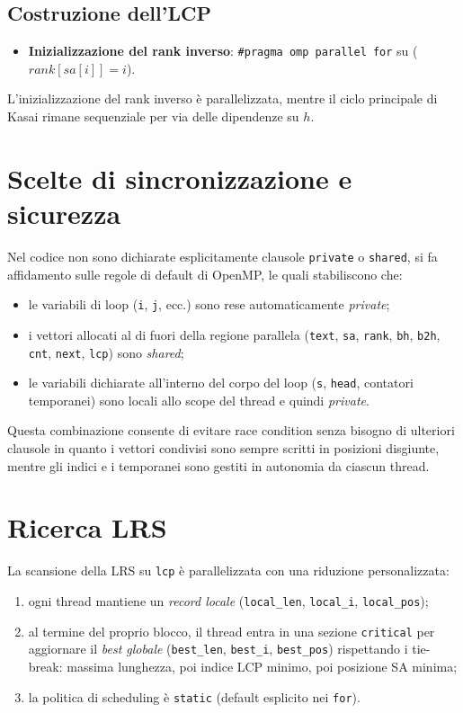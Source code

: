 		\subsection*{Costruzione dell'LCP}
			\begin{itemize}
				\item \textbf{Inizializzazione del rank inverso}: \texttt{\#pragma omp parallel for} su ($rank[sa[i]] = i$).
			\end{itemize}
			L’inizializzazione del rank inverso è parallelizzata, mentre il ciclo principale di Kasai rimane sequenziale per via delle dipendenze su $h$.
	
	\section{Scelte di sincronizzazione e sicurezza}
		Nel codice non sono dichiarate esplicitamente clausole \texttt{private} o \texttt{shared}, si fa affidamento sulle regole di default di OpenMP, le quali stabiliscono che:
		\begin{itemize}
			\item le variabili di loop (\texttt{i}, \texttt{j}, ecc.) sono rese automaticamente \emph{private};
			\item i vettori allocati al di fuori della regione parallela (\texttt{text}, \texttt{sa}, \texttt{rank}, \texttt{bh}, \texttt{b2h}, \texttt{cnt}, \texttt{next}, \texttt{lcp}) sono \emph{shared};
			\item le variabili dichiarate all’interno del corpo del loop (\texttt{s}, \texttt{head}, contatori temporanei) sono locali allo scope del thread e quindi \emph{private}.
		\end{itemize}
		
		Questa combinazione consente di evitare race condition senza bisogno di ulteriori clausole in quanto i vettori condivisi sono sempre scritti in posizioni disgiunte, mentre gli indici e i temporanei sono gestiti in autonomia da ciascun thread.
	
	\section{Ricerca LRS}
		La scansione della LRS su \texttt{lcp} è parallelizzata con una riduzione personalizzata:
		\begin{enumerate}
			\item ogni thread mantiene un \emph{record locale} (\texttt{local\_len}, \texttt{local\_i}, \texttt{local\_pos});
			\item al termine del proprio blocco, il thread entra in una sezione \texttt{critical} per aggiornare il \emph{best globale} (\texttt{best\_len}, \texttt{best\_i}, \texttt{best\_pos}) rispettando i tie-break: massima lunghezza, poi indice LCP minimo, poi posizione SA minima;
			\item la politica di scheduling è \texttt{static} (default esplicito nei \texttt{for}).
		\end{enumerate}
		

